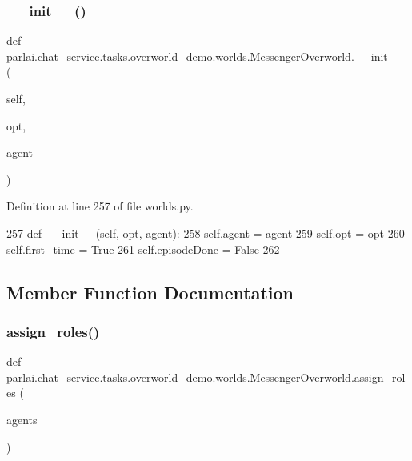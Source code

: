 \subsubsection{\texorpdfstring{\+\_\+\+\_\+init\+\_\+\+\_\+()}{\_\_init\_\_()}}
{\footnotesize\ttfamily def parlai.\+chat\+\_\+service.\+tasks.\+overworld\+\_\+demo.\+worlds.\+Messenger\+Overworld.\+\_\+\+\_\+init\+\_\+\+\_\+ (\begin{DoxyParamCaption}\item[{}]{self,  }\item[{}]{opt,  }\item[{}]{agent }\end{DoxyParamCaption})}



Definition at line 257 of file worlds.\+py.


\begin{DoxyCode}
257     \textcolor{keyword}{def }\_\_init\_\_(self, opt, agent):
258         self.agent = agent
259         self.opt = opt
260         self.first\_time = \textcolor{keyword}{True}
261         self.episodeDone = \textcolor{keyword}{False}
262 
\end{DoxyCode}


\subsection{Member Function Documentation}
\mbox{\label{classparlai_1_1chat__service_1_1tasks_1_1overworld__demo_1_1worlds_1_1MessengerOverworld_a9aec0393605e5b7299a77124ba8b3c51}} 
\subsubsection{\texorpdfstring{assign\+\_\+roles()}{assign\_roles()}}
{\footnotesize\ttfamily def parlai.\+chat\+\_\+service.\+tasks.\+overworld\+\_\+demo.\+worlds.\+Messenger\+Overworld.\+assign\+\_\+roles (\begin{DoxyParamCaption}\item[{}]{agents }\end{DoxyParamCaption})\hspace{0.3cm}{\ttfamily [static]}}



